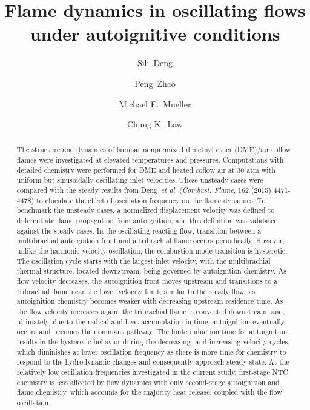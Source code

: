 \documentclass[review,3p,times]{elsarticle}
\begin{document}
\begin{frontmatter}

\title{Flame dynamics in oscillating flows under autoignitive conditions}

\author[Princeton]{Sili~Deng}
\author[Princeton,Oakland]{Peng~Zhao}
\author[Princeton]{Michael E.~Mueller}
\author[Princeton]{Chung K.~Law}

\address[Princeton]{Department of Mechanical and Aerospace Engineering, Princeton University, Princeton, NJ 08544, USA}
\address[Oakland]{Department of Mechanical Engineering, Oakland University, Rochester, MI 48309, USA}

\begin{abstract}

The structure and dynamics of laminar nonpremixed dimethyl ether (DME)/air coflow flames were investigated at elevated temperatures and pressures.  Computations with detailed chemistry were performed for DME and heated coflow air at $30$ atm with uniform but sinusoidally oscillating inlet velocities.  These unsteady cases were compared with the steady results from Deng~\emph{et al.} (\emph{Combust. Flame}, 162 (2015) 4471-4478) to elucidate the effect of oscillation frequency on the flame dynamics.  To benchmark the unsteady cases, a normalized displacement velocity was defined to differentiate flame propagation from autoignition, and this definition was validated against the steady cases.  In the oscillating reacting flow, transition between a multibrachial autoignition front and a tribrachial flame occurs periodically.  However, unlike the harmonic velocity oscillation, the combustion mode transition is hysteretic.  The oscillation cycle starts with the largest inlet velocity, with the multibrachial thermal structure, located downstream, being governed by autoignition chemistry.  As flow velocity decreases, the autoignition front moves upstream and transitions to a tribrachial flame near the lower velocity limit, similar to the steady flow, as autoignition chemistry becomes weaker with decreasing upstream residence time.  As the flow velocity increases again, the tribrachial flame is convected downstream, and, ultimately, due to the radical and heat accumulation in time, autoignition eventually occurs and becomes the dominant pathway.  The finite induction time for autoignition results in the hysteretic behavior during the decreasing- and increasing-velocity cycles, which diminishes at lower oscillation frequency as there is more time for chemistry to respond to the hydrodynamic changes and consequently approach steady state.  \textcolor{Rev1}{At the relatively low oscillation frequencies investigated in the current study, first-stage NTC chemistry is less affected by flow dynamics with only second-stage autoignition and flame chemistry, which accounts for the majority heat release, coupled with the flow oscillation.}


\end{abstract}
\end{frontmatter}
\end{document}
